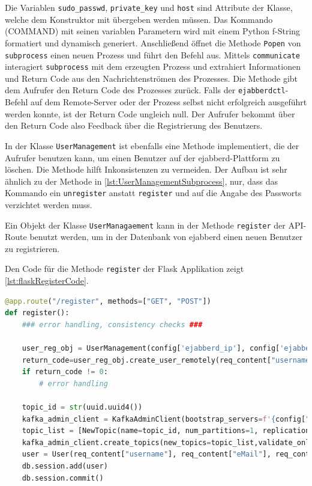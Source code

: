 \documentclass[a4paper,titlepage,halfparskip,12pt]{scrreprt}
\begin{document}
\begin{onehalfspacing}
Die Variablen \texttt{sudo\_passwd}, \texttt{private\_key} und \texttt{host} sind Attribute der Klasse, welche dem Konstruktor mit übergeben werden müssen. Das Kommando (COMMAND) mit seinen variablen Parametern wird mit einem Python f-String formatiert und dynamisch generiert. Anschließend öffnet die Methode \texttt{Popen} von \texttt{subprocess} einen neuen Prozess und führt den Befehl aus. Mittels \texttt{communicate} interagiert \texttt{subprocess} mit dem erzeugten Prozess und extrahiert Informationen und Return Code aus den Nachrichtenströmen des Prozesses. Die Methode gibt dem Aufrufer den Return Code des Prozesses zurück. Falls der \texttt{ejabberdctl}-Befehl auf dem Remote-Server oder der Prozess selbst nicht erfolgreich ausgeführt werden konnte, ist der Return Code ungleich null. Der Aufrufer bekommt über den Return Code also Feedback über die Registrierung des Benutzers.

In der Klasse \texttt{UserManagement} ist ebenfalls eine Methode implementiert, die der Aufrufer benutzen kann, um einen Benutzer auf der ejabberd-Plattform zu löschen. Die Methode hilft Inkonsistenzen zu vermeiden. Der Aufbau ist sehr ähnlich zu der Methode in \autoref{lst:UserManagementSubprocess}, nur, dass das Kommando ein \texttt{unregister} anstatt \texttt{register} und auf die Angabe des Passworts verzichtet werden muss.

Ein Objekt der Klasse \texttt{UserManagaement} kann in der Methode \texttt{register} der \ac{API}-Route benutzt werden, um in der Datenbank von ejabberd einen neuen Benutzer zu registrieren.

\pagebreak

Den Code für die Methode \texttt{register} der Flask Applikation zeigt \autoref{lst:flaskRegisterCode}.

\begin{lstlisting}[language=python, caption={Code der \acs{API}-Route für die Benutzerregistrierung}, label={lst:flaskRegisterCode}]
@app.route("/register", methods=["GET", "POST"])
def register():
    ### error handling, consistency checks ###

    user_reg_obj = UserManagement(config['ejabberd_ip'], config['ejabberd_ssh_user'],priv_key=config['ejabberd_ssh_private_key'], sudo_passwd=config['ejabberd_ssh_sudo_password'])
    return_code=user_reg_obj.create_user_remotely(req_content["username"], req_content["password"], config["ejabberd_domain"])
    if return_code != 0:
        # error handling

    topic_id = str(uuid.uuid4())
    kafka_admin_client = KafkaAdminClient(bootstrap_servers=f'{config["apache_kafka_ip"]}:{config["apache_kafka_port"]}')
    topic_list = [NewTopic(name=topic_id, num_partitions=1, replication_factor=1)]
    kafka_admin_client.create_topics(new_topics=topic_list,validate_only=False)
    user = User(req_content["username"], req_content["eMail"], req_content["password"], topic_id)
    db.session.add(user)
    db.session.commit()
    

\end{lstlisting}
\end{onehalfspacing}
\end{document}
